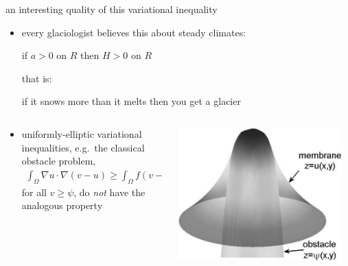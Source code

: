\documentclass[hide notes,intlimits]{beamer}
\begin{document}
\begin{frame}{an interesting quality of this variational inequality} 
\begin{itemize}
\item every glaciologist believes this about steady climates:
\begin{center}
 if $a>0$ on $R$ then $H>0$ on $R$
\end{center}
that is:
\begin{center}
 if it snows more than it melts then you get a glacier
\end{center}
\end{itemize}
\begin{columns}
\begin{column}{0.6\textwidth}
\begin{itemize}
\small
\item uniformly-elliptic variational inequalities, e.g.~the classical obstacle problem,
\begin{align*}
\int_{\Omega}  \nabla u \cdot \nabla (v - u)  \ge  \int_{\Omega} f (v - u),
\end{align*}
for all $v\ge \psi$, do \emph{not} have the analogous property
\end{itemize}
\end{column}
\begin{column}{0.35\textwidth}
\includegraphics[width=0.95\textwidth]{classicalobs}
\end{column}
\end{columns}
\end{frame}
\end{document}
